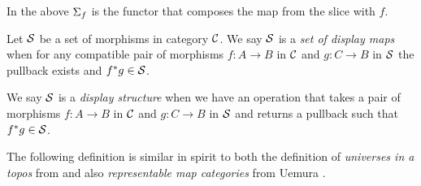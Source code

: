 In the above $\Sigma_{f}$ is the functor that composes the map from the slice with $f$.

\begin{dfn}[Display]
  Let $\mathcal{S}$ be a set of morphisms in category $\mathcal{C}$.
  We say $\mathcal{S}$ is a \textit{set of display maps} when for any compatible
  pair of morphisms $f : A \to B$ in $\mathcal{C}$ and $g : C \to B$ in $\mathcal{S}$
  the pullback exists and $f^{*}g \in \mathcal{S}$.

  We say $\mathcal{S}$ is a \textit{display structure} when we have an operation that
  takes a pair of morphisms $f : A \to B$ in $\mathcal{C}$ and $g : C \to B$ in $\mathcal{S}$
  and returns a pullback such that $f^{*}g \in \mathcal{S}$.
\end{dfn}


The following definition is similar in spirit to both the definition of
\textit{universes in a topos} from \cite{streicher} and also
\textit{representable map categories} from Uemura \cite{uemura2019general}.

